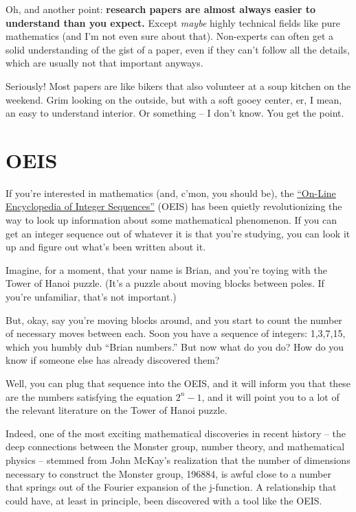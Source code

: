 Oh, and another point: \textbf{research papers are almost always easier to
  understand than you expect.} Except \textit{maybe} highly technical fields like
pure mathematics (and I'm not even sure about that). Non-experts can often get a
solid understanding of the gist of a paper, even if they can't follow all the
details, which are usually not that important anyways.

Seriously! Most papers are like bikers that also volunteer at a soup kitchen on
the weekend. Grim looking on the outside, but with a soft gooey center, er, I
mean, an easy to understand interior. Or something -- I don't know. You get the point.

\section{OEIS}

If you're interested in mathematics (and, c'mon, you should be), the \href{https://oeis.org/}{``On-Line Encyclopedia of Integer
Sequences''} (OEIS) has been quietly revolutionizing the way to look up information
about some mathematical phenomenon. If you can get an integer sequence out of whatever it is that you're studying,
you can look it up and figure out what's been written about it.

Imagine, for a moment, that your name is Brian, and you're toying with the Tower
of Hanoi puzzle. (It's a puzzle about moving blocks between poles. If you're
unfamiliar, that's not important.)


But, okay, say you're moving blocks around, and you start to count the number of
necessary moves between each. Soon you have a sequence of integers:
1,3,7,15, which you humbly dub ``Brian numbers.'' But now what do you do? How do you know if someone else has already discovered them?

Well, you can plug that sequence into the OEIS, and it will inform you that
these are the numbers satisfying the equation \(2^{n} - 1\), and it will point you to
a lot of the relevant literature on the Tower of Hanoi puzzle.

Indeed, one of the most exciting mathematical discoveries in recent history -- the deep connections between the Monster group, number theory, and mathematical physics -- stemmed from John McKay's realization that the number of dimensions necessary to construct the Monster group, 196884, is awful close to a number that springs out of the Fourier expansion of the j-function. A relationship that could have, at least in principle, been discovered with a tool like the OEIS. 

